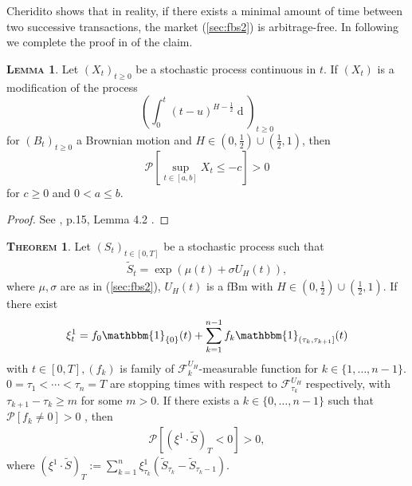 \documentclass[a4paper, twoside, 11pt]{article}
\theoremstyle{definition}
\newtheorem{theorem}[definition]{\scshape Theorem}
\newtheorem{lemma}[definition]{\scshape Lemma}
\newcommand{\brkt}[1]{\left({#1} \right)}
\begin{document}
	Cheridito shows that in reality, if there exists a minimal amount of time between two successive transactions, the market (\ref{sec:fbs2}) is arbitrage-free. In following we complete the proof in \cite{chridito} of the claim.
  \begin{lemma}
	Let $(X_t)_{t\ge 0}$ be a stochastic process continuous in $t$. If $(X_t)$ is a modification of the process 
	$$
	\brkt{\int_0^t (t-u)^{H-\frac{1}{2}}\mathop{dB_u}}_{t\ge 0}
	$$
	for $(B_t)_{t\ge 0}$ a Brownian motion and $H\in (0, \frac{1}{2})\cup(\frac{1}{2}, 1)$,
	then 
	$$
	\mathcal{P}[\sup\limits_{t\in[a,b]} X_t \le -c] > 0
	$$
	for $c \ge 0$ and $0< a\le b$.
	\label{sec:lll} 
  \end{lemma}

  \begin{proof}
	See \cite{chridito}, p.15, Lemma 4.2 .
  \end{proof}

  \begin{theorem}
	Let $(S_t)_{t\in[0, T]}$ be a stochastic process such that
	\begin{eqnarray}
	  \tilde{S}_t = \exp\brkt{\mu(t) + \sigma U_H(t)},
	  \label{sec:fbs}
	\end{eqnarray}
	where $\mu, \sigma$ are as in (\ref{sec:fbs2}), $U_H(t)$ is a fBm with $H\in (0, \frac{1}{2})\cup(\frac{1}{2}, 1)$. If there exist
	\begin{eqnarray*}
	\xi^1_t = f_0\mathbbm{1}_{\{0\}}(t)+\sum_{k=1}^{n-1} f_k \mathbbm{1}_{(\tau_k, \tau_{k+1}]}(t)
	\end{eqnarray*}
	with $t\in[0, T], (f_k)$ is family of  $\mathcal{F}^{U_H}_k $-measurable function for $k \in \{1,\dots,n-1\}$. $0 = \tau_1 < \cdots <\tau_n = T$ are stopping times with respect to $\mathcal{F}^{U_H}_{\tau_k} $ respectively,  with $\tau_{k+1} - \tau_k\ge m$ for some $m>0$. If there exists a $k \in \{0,\dots,n-1\}$ such that $\mathcal{P}[f_k\neq 0]>0$ , then
	\begin{eqnarray*}
	  \mathcal{P}[(\xi^1 \cdot \tilde{S})_T < 0] > 0,
	\end{eqnarray*}
	  \label{sec:claim}
	  where $(\xi^1 \cdot \tilde{S})_T := \sum_{k=1}^{n} \xi^1_{\tau_k} (\tilde{S}_{\tau_k} - \tilde{S}_{\tau_k-1})$.
  \end{theorem}
\end{document}
